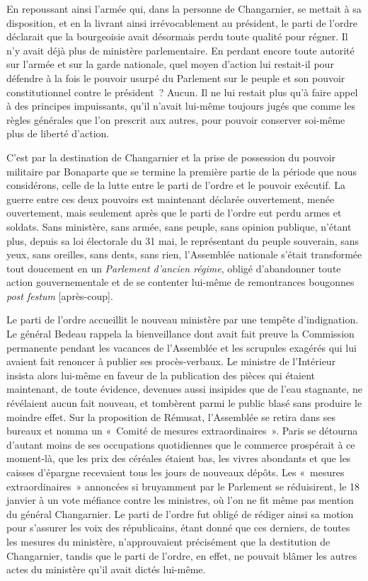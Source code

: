 \documentclass[french,twoside]{book} %
\begin{document}
En repoussant ainsi l’armée qui, dans la personne de Changarnier, se mettait à sa disposition, et en la livrant ainsi irrévocablement au président, le parti de l’ordre déclarait que la bourgeoisie avait désormais perdu toute qualité pour régner. Il n’y avait déjà plus de ministère parlementaire. En perdant encore toute autorité sur l’armée et sur la garde nationale, quel moyen d’action lui restait-il pour défendre à la fois le pouvoir usurpé du Parlement sur le peuple et son pouvoir constitutionnel contre le président ? Aucun. Il ne lui restait plus qu’à faire appel à des principes impuissants, qu’il n’avait lui-même toujours jugés que comme les règles générales que l’on prescrit aux autres, pour pouvoir conserver soi-même plus de liberté d’action.\par
C’est par la destination de Changarnier et la prise de possession du pouvoir militaire par Bonaparte que se termine la première partie de la période que nous considérons, celle de la lutte entre le parti de l’ordre et le pouvoir exécutif. La guerre entre ces deux pouvoirs est maintenant déclarée ouvertement, menée ouvertement, mais seulement après que le parti de l’ordre eut perdu armes et soldats. Sans ministère, sans armée, sans peuple, sans opinion publique, n’étant plus, depuis sa loi électorale du 31 mai, le représentant du peuple souverain, sans yeux, sans oreilles, sans dents, sans rien, l’Assemblée nationale s’était transformée tout doucement en un \emph{Parlement d’ancien régime}, obligé d’abandonner toute action gouvernementale et de se contenter lui-même de remontrances bougonnes \emph{post festum} [après-coup].\par
Le parti de l’ordre accueillit le nouveau ministère par une tempête d’indignation. Le général Bedeau rappela la bienveillance dont avait fait preuve la Commission permanente pendant les vacances de l’Assemblée et les scrupules exagérés qui lui avaient fait renoncer à publier ses procès-verbaux. Le ministre de l’Intérieur insista alors lui-même en faveur de la publication des pièces qui étaient maintenant, de toute évidence, devenues aussi insipides que de l’eau stagnante, ne révélaient aucun fait nouveau, et tombèrent parmi le public blasé sans produire le moindre effet. Sur la proposition de Rémusat, l’Assemblée se retira dans ses bureaux et nomma un « Comité de mesures extraordinaires ». Paris se détourna d’autant moins de ses occupations quotidiennes que le commerce prospérait à ce moment-là, que les prix des céréales étaient bas, les vivres abondants et que les caisses d’épargne recevaient tous les jours de nouveaux dépôts. Les « mesures extraordinaires » annoncées si bruyamment par le Parlement se réduisirent, le 18 janvier à un vote méfiance contre les ministres, où l’on ne fit même pas mention du général Changarnier. Le parti de l’ordre fut obligé de rédiger ainsi sa motion pour s’assurer les voix des républicains, étant donné que ces derniers, de toutes les mesures du ministère, n’approuvaient précisément que la destitution de Changarnier, tandis que le parti de l’ordre, en effet, ne pouvait blâmer les autres actes du ministère qu’il avait dictés lui-même.\par
\end{document}
